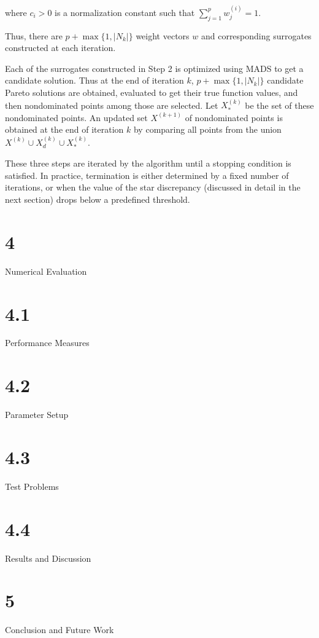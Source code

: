 where $c_i>0$ is a
normalization constant such that $\sum_{j=1}^{p} {w_j^{(i)}} = 1$.

\par\noindent Thus, there are $p+\max\{1,\mid N_k\mid\}$ weight vectors $w$ 
and corresponding surrogates constructed at each iteration. 

\smallskip

\noindent Each of the surrogates constructed in Step 2 is optimized using MADS 
to get a candidate solution. Thus at the end of iteration $k$, $p+\max\{1,\mid
N_k\mid\}$ candidate Pareto solutions are obtained, evaluated to
get their true function values, and then nondominated points among those are 
selected. Let $X_*^{(k)}$ be the set of these nondominated points. An updated 
set $X^{(k+1)}$ of nondominated points is obtained at the end of iteration $k$ 
by comparing all points from the  union $X^{(k)}\cup X_d^{(k)}\cup X_*^{(k)}$.

These three steps are iterated by the algorithm until a stopping 
condition is satisfied. In practice, termination is either determined by a 
fixed number of iterations, or when the value of the star discrepancy (discussed 
in detail in the next section) drops below a predefined threshold.
\vskip -3pt

\section{4}{Numerical Evaluation}\vskip -3pt
\section{4.1}{Performance Measures}
\section{4.2}{Parameter Setup}
\section{4.3}{Test Problems}\vskip -3pt
\section{4.4}{Results and Discussion}\vskip -3pt

\section{5}{Conclusion and Future Work}

